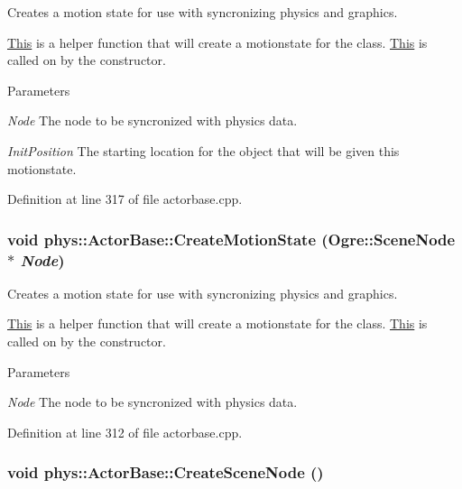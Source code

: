 Creates a motion state for use with syncronizing physics and graphics. 

\hyperlink{structThis}{This} is a helper function that will create a motionstate for the class. \hyperlink{structThis}{This} is called on by the constructor. 
\begin{DoxyParams}{Parameters}
\item[{\em Node}]The node to be syncronized with physics data. \item[{\em InitPosition}]The starting location for the object that will be given this motionstate. \end{DoxyParams}


Definition at line 317 of file actorbase.cpp.

\hypertarget{classphys_1_1ActorBase_a23e6edcd5c18b89c40abf02feba6bc11}{
\subsubsection[{CreateMotionState}]{\setlength{\rightskip}{0pt plus 5cm}void phys::ActorBase::CreateMotionState (Ogre::SceneNode $\ast$ {\em Node})}}
\label{d8/d0f/classphys_1_1ActorBase_a23e6edcd5c18b89c40abf02feba6bc11}


Creates a motion state for use with syncronizing physics and graphics. 

\hyperlink{structThis}{This} is a helper function that will create a motionstate for the class. \hyperlink{structThis}{This} is called on by the constructor. 
\begin{DoxyParams}{Parameters}
\item[{\em Node}]The node to be syncronized with physics data. \end{DoxyParams}


Definition at line 312 of file actorbase.cpp.

\hypertarget{classphys_1_1ActorBase_a125d6f0a0b4072e64490638c074eea2d}{
\subsubsection[{CreateSceneNode}]{\setlength{\rightskip}{0pt plus 5cm}void phys::ActorBase::CreateSceneNode ()}}
\label{d8/d0f/classphys_1_1ActorBase_a125d6f0a0b4072e64490638c074eea2d}


